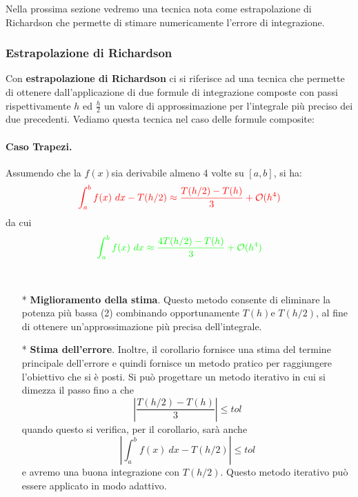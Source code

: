 \documentclass{article}
\begin{document}
Nella prossima sezione vedremo una tecnica nota come estrapolazione di
Richardson che permette di stimare numericamente l'errore di integrazione.
\subsubsection{Estrapolazione di Richardson}
Con \textbf{estrapolazione di Richardson} ci si riferisce ad una tecnica che
permette di ottenere dall'applicazione di due formule di integrazione composte
con passi rispettivamente $h$ ed $\frac{h}{2}$ un valore di approssimazione
per l'integrale più preciso dei due precedenti. Vediamo questa tecnica nel
caso delle formule composite:
\paragraph{Caso Trapezi.} 
\begin{corollary}
    Assumendo che la $f(x)$sia derivabile almeno 4 volte su $[a,b]$, si
    ha:
    $${\color{red}\displaystyle\int_{a}^{b}f(x)\ dx-T(h/2)\approx
    \frac{T(h/2)-T(h)}{3}+\mathcal{O}(h^4)}$$
    da cui 
    $${\color{green}\displaystyle\int_{a}^{b}f(x)\ dx\approx
    \frac{4T(h/2)-T(h)}{3}+\mathcal{O}(h^4)}$$
\end{corollary} 
\begin{oss}\leavevmode\
    \begin{itemize}
        \item[{\color{green}*}]\textbf{Miglioramento della stima}. Questo metodo consente di eliminare la potenza più bassa (2) 
            combinando opportunamente $T(h)$e $T(h/2)$, al fine di ottenere un'approssimazione
            più precisa dell'integrale.
        \item[{\color{red}*}]\textbf{Stima dell'errore}. Inoltre, il corollario fornisce una stima
            del termine principale dell'errore e quindi fornisce un metodo
            pratico per raggiungere l'obiettivo che si è posti. Si può
            progettare un metodo iterativo in cui si dimezza il passo fino
            a che 
            \begin{equation}\label{eq:stima_errore_integrazione}
                \left\lvert \frac{T(h/2)-T(h)}{3}\right\rvert\leq tol
            \end{equation} 
            quando questo si verifica, per il corollario, sarà anche 
            $$\left\lvert \displaystyle\int_{a}^{b}f(x)\
            dx-T(h/2)\right\rvert\leq tol$$
            e avremo una buona integrazione con $T(h/2)$. Questo metodo
            iterativo può essere applicato in modo adattivo. 
    \end{itemize}
\end{oss}
\end{document}
